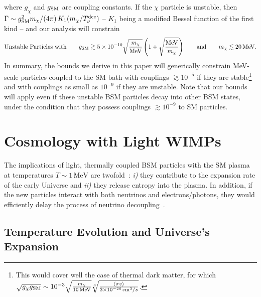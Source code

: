 where $g_\chi$ and $g_{\rm SM}$ are coupling constants. If the $\chi$ particle is unstable, then $\Gamma \sim g_{\rm SM}^2m_\chi /(4\pi) \, K_{1}(m_\chi/T_{\nu}^{\rm dec})$ -- $K_{1}$ being a modified Bessel function of the first kind -- and our analysis will constrain
\begin{align}\label{eq:Decay}
\text{Unstable Particles with} \qquad 
    g_{\rm SM} \gtrsim  5\times 10^{-10} \sqrt{\frac{m_\chi}{\text{MeV}}}\left(1+ \sqrt{\frac{\text{MeV}}{m_\chi}} \right) \qquad \text{and} \qquad m_\chi \lesssim 20\,\text{MeV}.
\end{align}
In summary, the bounds we derive in this paper will generically constrain MeV-scale particles coupled to the SM bath with couplings $ \gtrsim 10^{-5}$ if they are stable\footnote{This would cover well the case of thermal dark matter, for which $\sqrt{g_\chi g_{\rm SM}} \sim 10^{-3} \sqrt{\frac{m_\chi}{10\,\text{MeV}}} \sqrt[4]{\frac{\left<\sigma v\right>}{3\times 10^{-26}\,\text{cm}^3/s} }$.} and with couplings as small as $10^{-9}$ if they are unstable. Note that our bounds will apply even if these unstable BSM particles decay into other BSM states, under the condition that they possess couplings $\gtrsim 10^{-9}$ to SM particles.

\section{Cosmology with Light WIMPs}
The implications of light, thermally coupled BSM particles with the SM plasma at temperatures $T \sim 1 \,\text{MeV}$ are twofold~\cite{Kolb:1986nf}: \textit{i)} they contribute to the expansion rate of the early Universe and \textit{ii)} they release entropy into the plasma.
In addition, if the new particles interact with both neutrinos and electrons/photons, they would efficiently delay the process of neutrino decoupling~\cite{Serpico:2004nm,Escudero:2018mvt}.

\subsection{Temperature Evolution and Universe's Expansion}\label{sec:earlyUniverse_method}

